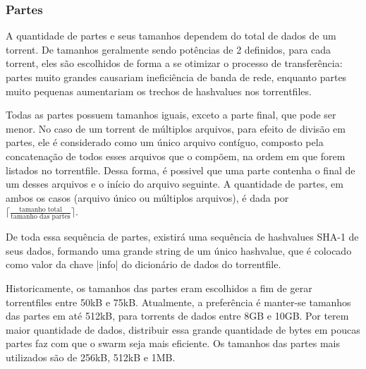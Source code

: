 \subsubsection*{Partes}
\label{subsec:partes}

A quantidade de partes e seus tamanhos dependem do total de dados de um \gls*{torrent}.
De tamanhos geralmente sendo potências de 2 definidos, para cada \gls*{torrent}, eles
são escolhidos de forma a se otimizar o processo de transferência: partes muito grandes
causariam ineficiência de banda de rede, enquanto partes muito pequenas aumentariam os
trechos de \glspl*{hashvalue} nos \glspl*{torrentfile}.

Todas as partes possuem tamanhos iguais, exceto a parte final, que pode ser menor. No
caso de um \gls*{torrent} de múltiplos arquivos, para efeito de divisão em partes, ele é
considerado como um único arquivo contíguo, composto pela concatenação de todos esses
arquivos que o compõem, na ordem em que forem listados no \gls*{torrentfile}. Dessa
forma, é possivel que uma parte contenha o final de um desses arquivos e o início do
arquivo seguinte. A quantidade de partes, em ambos os casos (arquivo único ou
múltiplos arquivos), é dada por
$\lceil \frac{\textrm{tamanho total}}{\textrm{tamanho das partes}} \rceil$.

De toda essa sequência de partes, existirá uma sequência de \glspl*{hashvalue} SHA-1 de
seus dados, formando uma grande \gls*{string} de um único \gls*{hashvalue}, que é
colocado como valor da chave \bverb|info| do dicionário de dados do \gls*{torrentfile}.

Historicamente, os tamanhos das partes eram escolhidos a fim de gerar
\glspl*{torrentfile} entre 50kB e 75kB. Atualmente, a preferência é manter-se tamanhos
das partes em até 512kB, para \glspl*{torrent} de dados entre 8GB e 10GB. Por terem
maior quantidade de dados, distribuir essa grande quantidade de bytes em poucas partes
faz com que o \gls*{swarm} seja mais eficiente. Os tamanhos das partes mais utilizados
são de 256kB, 512kB e 1MB.